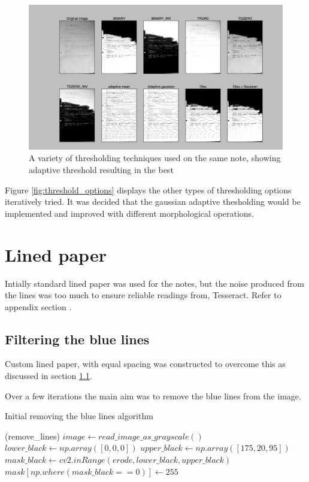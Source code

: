 \begin{figure}[H]
  \centering
  \includegraphics{images/thresholding_options}
  \caption{A variety of thresholding techniques used on the same note, showing adaptive threshold resulting in the best}
  \label{fig:thresholding_options}
\end{figure}

Figure \ref{fig:threshold_options} displays the other types of thresholding options iteratively tried. It was decided that the gaussian adaptive thesholding would be implemented and improved with different morphological operations.

\section{Lined paper}
Intially standard lined paper was used for the notes, but the noise produced from the lines was too much to ensure reliable readings from, Tesseract. Refer to appendix \cite{appendix:image_processing} section \cite{processing:pre-line}.

\subsection{Filtering the blue lines}
Custom lined paper, with equal spacing was constructed to overcome this as discussed in section \ref{}.

Over a few iterations the main aim was to remove the blue lines from the image.
\begin{algorithm}
\caption{Initial removing the blue lines algorithm}
\label{algorithm:threshold1}
\begin{algorithmic}[1]
  \Function(remove\_lines)
    \State $image \gets read\_image\_as\_grayscale()$
    \State $lower\_black \gets np.array([0,0,0])$
    \State $upper\_black \gets np.array([175,20, 95])$
    \State $mask\_black \gets cv2.inRange(erode, lower\_black, upper\_black)$
    \State $mask[np.where(mask\_black == 0)] \gets 255$
  \EndFunction
  \end{algorithmic}
\end{algorithm}

